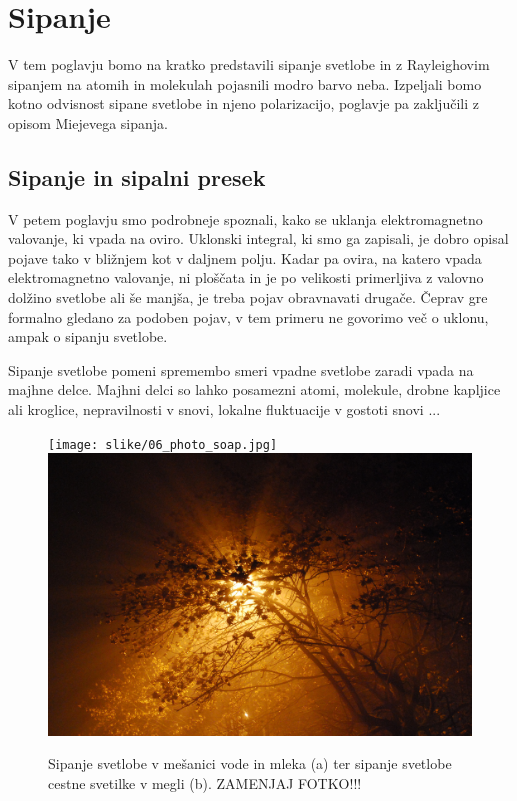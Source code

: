 
\chapter{Sipanje}
V tem poglavju bomo na kratko predstavili sipanje svetlobe in z Rayleighovim
sipanjem na atomih in molekulah pojasnili modro barvo neba. Izpeljali bomo 
kotno odvisnost sipane svetlobe in njeno polarizacijo, poglavje pa zaključili
z opisom Miejevega sipanja.

\section{Sipanje in sipalni presek}
V petem poglavju smo podrobneje spoznali, kako se uklanja elektromagnetno 
valovanje, ki vpada na oviro. Uklonski integral, ki smo ga zapisali,
je dobro opisal pojave tako v bližnjem kot v daljnem polju. Kadar pa ovira,
na katero vpada elektromagnetno valovanje, ni ploščata in je 
po velikosti primerljiva z valovno dolžino svetlobe ali še manjša, je treba 
pojav obravnavati drugače. Čeprav gre formalno gledano za podoben pojav,
v tem primeru ne govorimo več o uklonu, ampak o sipanju svetlobe.

Sipanje svetlobe pomeni spremembo smeri vpadne svetlobe zaradi vpada na majhne delce. 
Majhni delci so lahko posamezni atomi, molekule, drobne kapljice ali kroglice, 
nepravilnosti v snovi, lokalne fluktuacije v gostoti snovi ... 
\begin{figure}[!h]
\centering
\texttt{[image: slike/06\_photo\_soap.jpg]}\hfill
\includegraphics[width=7truecm]{slike/07_megla.jpg}
\caption{Sipanje svetlobe v mešanici vode in mleka (a) ter sipanje svetlobe 
cestne svetilke v megli (b). ZAMENJAJ FOTKO!!!}
\label{fig:07_Sipanje}
\end{figure}

